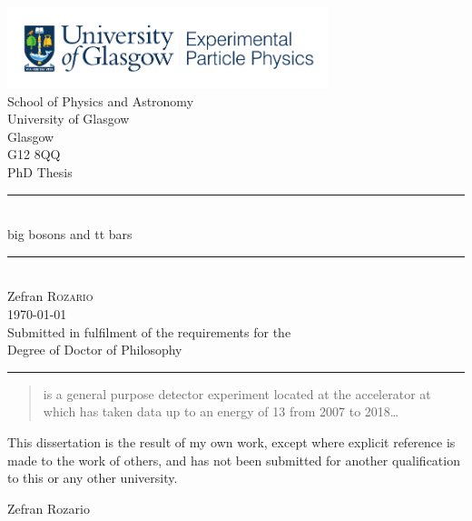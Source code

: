 \thispagestyle{empty}%

	\begin{center} %
	\includegraphics[width=0.7\textwidth]{ExperPartPhys_colour.pdf}~\\[4mm]%
	School of Physics and Astronomy\\
	University of Glasgow\\
	Glasgow\\
	G12 8QQ\\[8mm] %

    {\Large PhD Thesis}
	\rule[0.4cm]{15cm}{.2pt}\\ %

	{\Huge big bosons and tt bars}\\[1cm] %
	\rule[0.4cm]{15cm}{.2pt}\\[4cm] %
	{\LARGE Zefran \textsc{Rozario}}\\[1cm] %
	{\small \today}\\[1cm] %
	{\small 
		Submitted in fulfilment of the requirements for the\\
		Degree of Doctor of Philosophy}\\[1cm] %
	\rule[0.4cm]{15cm}{.2pt} 
	\end{center}
\begin{abstract}%
  \ATLAS is a general purpose detector experiment located at the \LHC accelerator at \CERN which has taken data up to an energy of \unit{13}{\TeV} from 2007 to 2018\dots
\end{abstract}


\begin{declaration}
  This dissertation is the result of my own work, except where explicit
  reference is made to the work of others, and has not been submitted
  for another qualification to this or any other university.
  \vspace*{1cm}
  \begin{flushright}
    Zefran Rozario
  \end{flushright}
\end{declaration}



